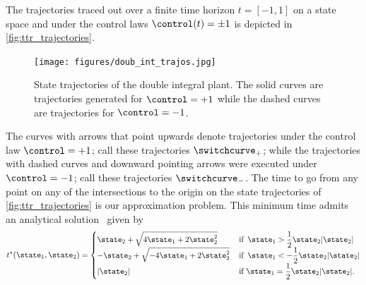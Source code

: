 The trajectories traced out over a finite time horizon $t=[-1, 1]$ on a state space and under the control laws $\control(t) = \pm 1$ is depicted in \autoref{fig:ttr_trajectories}. 
\begin{figure}[tb!]
	\centering
	\texttt{[image: figures/doub\_int\_trajos.jpg]}
	\caption{State trajectories of the double integral plant. The solid curves are trajectories generated for $\control=+1$ while the dashed curves are trajectories for $\control = -1$.}
	\label{fig:ttr_trajectories}
\end{figure}
%
The curves with arrows that point upwards denote trajectories under the control law  $\control=+1$; call these trajectories $\switchcurve_+$; while the  trajectories with dashed curves and downward pointing arrows were executed under $\control=-1$; call these trajectories $\switchcurve_-$. The time to go from any point on any of the intersections to the origin on the state trajectories of \autoref{fig:ttr_trajectories} is our approximation problem.  This minimum time admits an analytical solution~\cite{AthansFalb} given by
%
\begin{align}
	t^\star(\state_1, \state_2) = %
	\begin{cases}
		\state_2 + \sqrt{4 \state_1 + 2 \state_2^2} \, &\text{if } \, \state_1 > \dfrac{1}{2} \state_2 |\state_2| \\
		-\state_2 + \sqrt{-4 \state_1 + 2 \state_2^2} \, &\text{if }  \, \state_1 < -\dfrac{1}{2} \state_2 |\state_2| \\
		|\state_2| &\text{if } \state_1 = \dfrac{1}{2} \state_2 |\state_2|.
	\end{cases}
\end{align}


